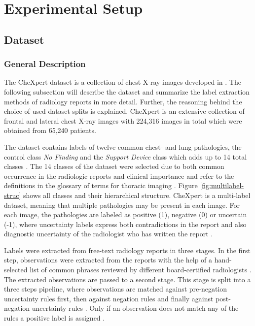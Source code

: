 \section{Experimental Setup}
\label{section: experimental-setup}
\subsection{Dataset}
\subsubsection{General Description}
\label{section: dataset}
The CheXpert dataset is a collection of chest X-ray images developed in \citep{Irvin2019}.
The following subsection will describe the dataset and summarize the label extraction methods of radiology reports in more detail.
Further, the reasoning behind the choice of used dataset splits is explained. 
CheXpert is an extensive collection of frontal and lateral chest X-ray images with 224,316 images in total which were obtained from 65,240 patients.
\par
The dataset contains labels of twelve common chest- and lung pathologies, the control class \textit{No Finding} and the \textit{Support Device} class which adds up to 14 total classes \citep{Irvin2019}.
The 14 classes of the dataset were selected due to both common occurrence in the radiologic reports and clinical importance \citep{Irvin2019} and refer to the definitions in the glossary of terms for thoracic imaging \citep{Hansell2008}.
Figure \ref{fig:multilabel-struc} shows all classes and their hierarchical structure.
CheXpert is a multi-label dataset, meaning that multiple pathologies may be present in each image.
For each image, the pathologies are labeled as positive (1), negative (0) or uncertain (-1), where uncertainty labels express both contradictions in the report and also diagnostic uncertainty of the radiologist who has written the report \citep{Irvin2019}.
\par
Labels were extracted from free-text radiology reports in three stages.
In the first step, observations were extracted from the reports with the help of a hand-selected list of common phrases reviewed by different board-certified radiologists \citep{Irvin2019}.
The extracted observations are passed to a second stage.
This stage is split into a three steps pipeline, where observations are matched against pre-negation uncertainty rules first, then against negation rules and finally against post-negation uncertainty rules \citep{Irvin2019}.
Only if an observation does not match any of the rules a positive label is assigned \citep{Irvin2019}.
